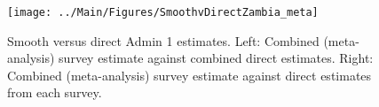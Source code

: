 \documentclass[12pt]{article}\usepackage[]{graphicx}\usepackage[]{color}
\newenvironment{knitrout}{}{} %
\begin{document}



\begin{knitrout}
\color{fgcolor}\begin{figure}[bht]

{\centering \texttt{[image: ../Main/Figures/SmoothvDirectZambia\_meta]} 

}

\caption[Smooth versus direct Admin 1 estimates]{Smooth versus direct Admin 1 estimates. Left: Combined (meta-analysis) survey estimate against combined direct estimates. Right: Combined (meta-analysis) survey estimate against direct estimates from each survey.}\label{fig:unnamed-chunk-333}
\end{figure}


\end{knitrout}
\end{document}
